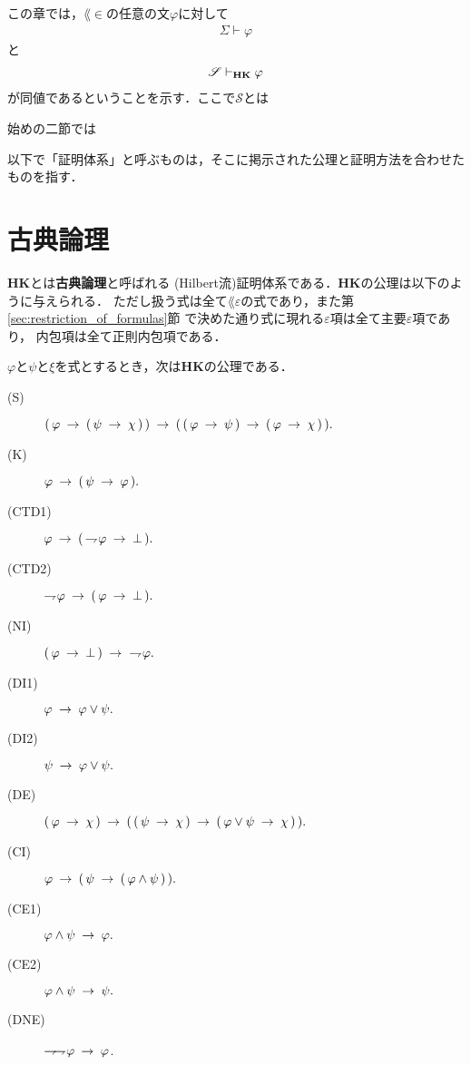 	この章では，$\lang{\in}$の任意の文$\varphi$に対して
	\begin{align}
		\Sigma \vdash \varphi
	\end{align}
	と
	\begin{align}
		\mathscr{S} \provable{\mbox{{\bf HK}}} \varphi
	\end{align}
	が同値であるということを示す．ここで$\mathscr{S}$とは
	
	始めの二節では
	
	以下で「証明体系」と呼ぶものは，そこに掲示された公理と証明方法を合わせたものを指す．
	
\section{古典論理}
	{\bf HK}とは{\bf 古典論理}と呼ばれる
	(Hilbert流)証明体系である．{\bf HK}の公理は以下のように与えられる．
	ただし扱う式は全て$\lang{\varepsilon}$の式であり，また第\ref{sec:restriction_of_formulas}節
	で決めた通り式に現れる$\varepsilon$項は全て主要$\varepsilon$項であり，
	内包項は全て正則内包項である．
	
	\begin{screen}
		\begin{logicalaxm}
			$\varphi$と$\psi$と$\xi$を式とするとき，次は{\bf HK}の公理である．
			\begin{description}
				\item[(S)] $(\, \varphi \rarrow (\, \psi \rarrow \chi\, )\, ) 
					\rarrow (\, (\, \varphi \rarrow \psi\, )
					\rarrow (\, \varphi \rarrow \chi\, )\, ).$
				\item[(K)] $\varphi \rarrow (\, \psi \rarrow \varphi\, ).$
				\item[(CTD1)] $\varphi \rarrow (\, \negation \varphi \rarrow \bot\, ).$
				\item[(CTD2)] $\negation \varphi \rarrow (\, \varphi \rarrow \bot\, ).$
				\item[(NI)] $(\, \varphi \rarrow \bot\, ) \rarrow\ \negation \varphi.$
				\item[(DI1)] $\varphi \rarrow \varphi \vee \psi.$
				\item[(DI2)] $\psi \rarrow \varphi \vee \psi.$
				\item[(DE)] $(\, \varphi \rarrow \chi\, ) \rarrow 
					(\, (\, \psi \rarrow \chi\, ) 
					\rarrow (\, \varphi \vee \psi \rarrow \chi\, )\, ).$
				\item[(CI)] $\varphi \rarrow (\, \psi \rarrow (\, \varphi \wedge \psi\, )\, ).$
				\item[(CE1)] $\varphi \wedge \psi \rarrow \varphi.$
				\item[(CE2)] $\varphi \wedge \psi \rarrow \psi.$
				\item[(DNE)] $\negation \negation \varphi \rarrow \varphi$.
			\end{description}
		\end{logicalaxm}
	\end{screen}
	

